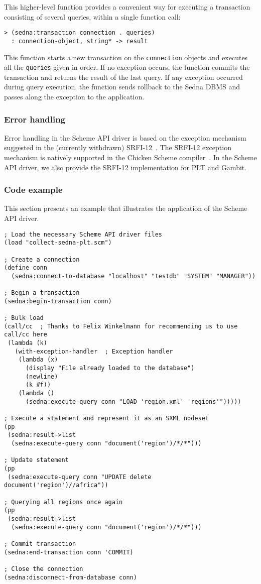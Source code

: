 \documentclass[a4paper,12pt]{article}
\begin{document}
This higher-level function provides a convenient way for executing a
transaction consisting of several queries, within a single function call:

\begin{verbatim}> (sedna:transaction connection . queries)
  : connection-object, string* -> result\end{verbatim}

This function starts a new transaction on the \texttt{connection} objects and
executes all the \texttt{queries} given in order.
If no exception occurs, the function commits the transaction and returns the
result of the last query.
If any exception occurred during query execution, the function sends rollback
to the Sedna DBMS and passes along the exception to the application.


\subsubsection{Error handling}
\label{scheme-errors}

Error handling in the Scheme API driver is based on the exception mechanism
suggested in the (currently withdrawn) SRFI-12~\cite{paper:srfi-12}.
The SRFI-12 exception mechanism is natively supported in the Chicken Scheme
compiler~\cite{paper:chicken}.
In the Scheme API driver, we also provide the SRFI-12 implementation for PLT
and Gambit.


\subsubsection{Code example}

This section presents an example that illustrates the application of
the Scheme API driver.

\begin{verbatim}; Load the necessary Scheme API driver files
(load "collect-sedna-plt.scm")

; Create a connection
(define conn
  (sedna:connect-to-database "localhost" "testdb" "SYSTEM" "MANAGER"))

; Begin a transaction
(sedna:begin-transaction conn)

; Bulk load
(call/cc  ; Thanks to Felix Winkelmann for recommending us to use call/cc here
 (lambda (k)
   (with-exception-handler  ; Exception handler
    (lambda (x)
      (display "File already loaded to the database")
      (newline)
      (k #f))
    (lambda ()
      (sedna:execute-query conn "LOAD 'region.xml' 'regions'")))))

; Execute a statement and represent it as an SXML nodeset
(pp
 (sedna:result->list
  (sedna:execute-query conn "document('region')/*/*")))

; Update statement
(pp
 (sedna:execute-query conn "UPDATE delete document('region')//africa"))

; Querying all regions once again
(pp
 (sedna:result->list
  (sedna:execute-query conn "document('region')/*/*")))

; Commit transaction
(sedna:end-transaction conn 'COMMIT)

; Close the connection
(sedna:disconnect-from-database conn)\end{verbatim}
\end{document}
